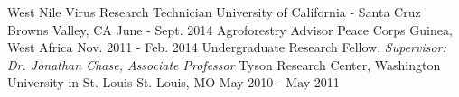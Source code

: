 

\begin{cventries}

  \cventry
    {West Nile Virus Research Technician} %
    {University of California - Santa Cruz} %
    {Browns Valley, CA} %
    {June - Sept. 2014} %
  {}%
\medskip
  \cventry
    {Agroforestry Advisor} %
    {Peace Corps} %
    {Guinea, West Africa} %
    {Nov. 2011 - Feb. 2014} %
{}%
\medskip
  \cventry
    {Undergraduate Research Fellow, \textit{Supervisor: Dr. Jonathan Chase, Associate Professor}} %
    {Tyson Research Center, Washington University in St. Louis} %
    {St. Louis, MO} %
    {May 2010 - May 2011} %
{} %

\end{cventries}
